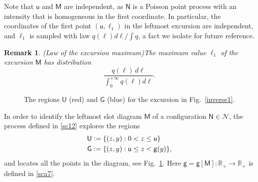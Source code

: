 \documentclass[12pt]{article}
\numberwithin{equation}{section}
\newtheorem{remark}[theorem]{Remark}
\newcommand{\RR}{\mathbb R}
\newcommand{\sG}{\mathsf{G}}
\newcommand{\sM}{\mathsf{M}}
\newcommand{\sN}{\mathsf{N}}
\newcommand{\sU}{{\mathsf{U}}}
\newcommand{\sg}{\mathsf{g}}
\newcommand{\su}{{\mathsf{u}}}
\begin{document}
Note that $\su$ and $\sM$ are independent, as $\sN$ is a Poisson point process with an intensity that is homogeneous in the first coordinate. In particular, the coordinates of the first point $(\su, \ell_1)$ in the leftmost excursion are independent, and $\ell_1$ is sampled with law $q(\ell) d\ell/\int q$, a fact we isolate for future reference.

\begin{remark}(Law of the excursion maximum)\label{maxi}
The maximum value $\ell_1$ of the excursion $\sM$ has distribution
\begin{equation}\label{maxlaw}
 \frac{q(\ell)\,d\ell}{\int_0^{+\infty} q(\ell)d\ell}.
\end{equation}
\end{remark}





\begin{figure}[th]
\centering
{}
  
\caption{The regions $\sU$ (red) and $\sG$ (blue) for the excursion in Fig.~\ref{inverse1}.}
\label{UG}
\end{figure}

In order to identify the leftmost slot diagram $\sM$ of a configuration $\sN\in \mathcal N$, the process defined in \eqref{sc12} explores the regions 
\begin{align}
\sU&\vcentcolon =\{(z, y):0<z\le \su\}\label{sA1}\\
\sG&\vcentcolon =\{(z, y):\su\le z<\sg(y)\}\label{sA2},
\end{align}
and locates all the points in the diagram, see Fig.~\ref{UG}. Here $\sg=\sg[\sM]:\RR_+\to \RR_+$ is defined in \eqref{sca7}.  
\end{document}
